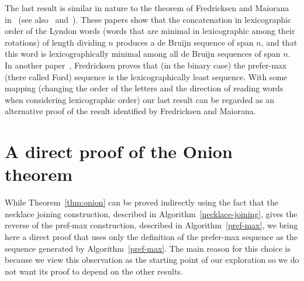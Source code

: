 \documentclass{article}
\theoremstyle{definition}
\begin{document}
The last result is similar in nature to the theorem of Fredricksen and Maiorana in~\cite{Fredricksen1978} (see also~\cite{Moreno2004} and~\cite{Moreno2015}).	
These papers show that the concatenation in lexicographic order of the Lyndon words (words that are minimal in lexicographic among their rotations) of length dividing $n$ produces a de Bruijn sequence of span $n$, and that this word is lexicographically minimal among all de Bruijn sequences of span $n$. In another paper~\cite{Fredricksen1970}, Fredricksen proves that (in the binary case) the prefer-max (there called Ford) sequence is the lexicographically least sequence. With some mapping (changing the order of the letters and the direction of reading words when considering lexicographic order) our last result can be regarded as an alternative proof of the result identified by Fredricksen and Maiorana.


\section{A direct proof of the Onion theorem}

While Theorem~\ref{thm:onion} can be proved indirectly using the fact that the necklace joining construction, described in Algorithm~\ref{necklace-joining}, gives the reverse of the pref-max construction, described in Algorithm~\ref{pref-max}, we bring here a direct proof that uses only the definition of the prefer-max sequence as the sequence generated by Algorithm~\ref{pref-max}. The main reason for this choice is because we view this observation as the starting point of our exploration so we do not want its proof to depend on the other results.
\end{document}
